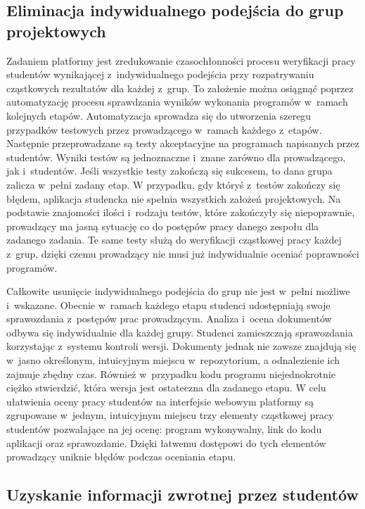 \subsection{Eliminacja indywidualnego podejścia do grup projektowych}

Zadaniem platformy jest zredukowanie czasochłonności procesu weryfikacji pracy studentów wynikającej z~indywidualnego podejścia przy rozpatrywaniu cząstkowych rezultatów dla każdej z~grup.
To założenie można osiągnąć poprzez automatyzację procesu sprawdzania wyników wykonania programów w~ramach kolejnych etapów.
Automatyzacja sprowadza się do utworzenia szeregu przypadków testowych przez prowadzącego w~ramach każdego z~etapów.
Następnie przeprowadzane są testy akceptacyjne na programach napisanych przez studentów.
Wyniki testów są jednoznaczne i~znane zarówno dla prowadzącego, jak i~studentów.
Jeśli wszystkie testy zakończą się sukcesem, to dana grupa zalicza w~pełni zadany etap.
W przypadku, gdy któryś z~testów zakończy się błędem, aplikacja studencka nie spełnia wszystkich założeń projektowych.
Na podstawie znajomości ilości i~rodzaju testów, które zakończyły się niepoprawnie, prowadzący ma jasną sytuację co do postępów pracy danego zespołu dla zadanego zadania.
Te same testy służą do weryfikacji cząstkowej pracy każdej z~grup, dzięki czemu prowadzący nie musi już indywidualnie oceniać poprawności programów.

Całkowite usunięcie indywidualnego podejścia do grup nie jest w~pełni możliwe i~wskazane.
Obecnie w~ramach każdego etapu studenci udostępniają swoje sprawozdania z~postępów prac prowadzącym.
Analiza i~ocena dokumentów odbywa się indywidualnie dla każdej grupy.
Studenci zamieszczają sprawozdania korzystając z~systemu kontroli wersji.
Dokumenty jednak nie zawsze znajdują się w~jasno określonym, intuicyjnym miejscu w~repozytorium, a odnalezienie ich zajmuje zbędny czas.
Również w~przypadku kodu programu niejednokrotnie ciężko stwierdzić, która wersja jest ostateczna dla zadanego etapu.
W celu ułatwienia oceny pracy studentów na interfejsie webowym platformy są zgrupowane w~jednym, intuicyjnym miejscu trzy elementy cząstkowej pracy studentów pozwalające na jej ocenę: program wykonywalny, link do kodu aplikacji oraz sprawozdanie.
Dzięki łatwemu dostępowi do tych elementów prowadzący uniknie błędów podczas oceniania etapu.


\subsection{Uzyskanie informacji zwrotnej przez studentów}
\label{feedback}

